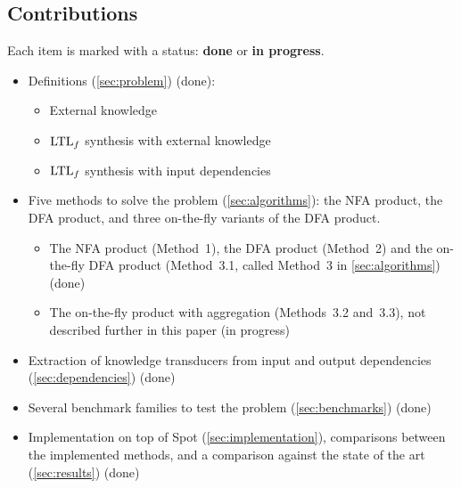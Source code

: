 \subsection{Contributions}

Each item is marked with a status: \textbf{done} or \textbf{in progress}.

\begin{itemize}
  \item Definitions (\cref{sec:problem}) (done):
  \begin{itemize}
    \item External knowledge
    \item $\text{LTL}_f$ synthesis with external knowledge
    \item $\text{LTL}_f$ synthesis with input dependencies
  \end{itemize}
  \item Five methods to solve the problem (\cref{sec:algorithms}): the NFA product, the DFA product, and three on-the-fly variants of the DFA product.
  \begin{itemize}
    \item The NFA product (Method~1), the DFA product (Method~2) and the on-the-fly DFA product (Method~3.1, called Method~3 in \cref{sec:algorithms}) (done)
    \item The on-the-fly product with aggregation (Methods~3.2 and~3.3), not described further in this paper (in progress)
  \end{itemize}
  \item Extraction of knowledge transducers from input and output dependencies (\cref{sec:dependencies}) (done)
  \item Several benchmark families to test the problem (\cref{sec:benchmarks}) (done)
  \item Implementation on top of Spot (\cref{sec:implementation}), comparisons between the implemented methods, and a comparison against the state of the art (\cref{sec:results}) (done)
\end{itemize}
